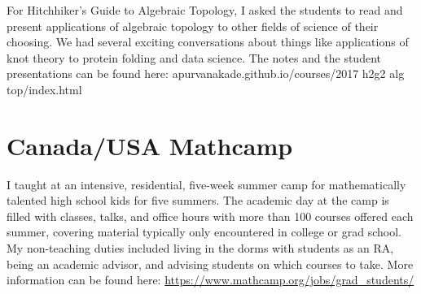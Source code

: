 \documentclass[
]{report}
\begin{document}
For Hitchhiker's Guide to Algebraic Topology, I asked the students to read and present applications of algebraic topology to other fields of science of their choosing.
We had several exciting conversations about things like applications of knot theory to protein folding and data science. The notes and the student presentations can be found here: apurvanakade.github.io/courses/2017 h2g2 alg top/index.html

\hypertarget{canadausa-mathcamp}{%
\section{Canada/USA Mathcamp}\label{canadausa-mathcamp}}

I taught at an intensive, residential, five-week summer camp for mathematically talented high school
kids for five summers. The academic day at the camp is filled with classes, talks, and office hours with
more than 100 courses offered each summer, covering material typically only encountered in college or
grad school. My non-teaching duties included living in the dorms with students as an RA, being an
academic advisor, and advising students on which courses to take. More information can be found here:
\url{https://www.mathcamp.org/jobs/grad_students/}
\end{document}
